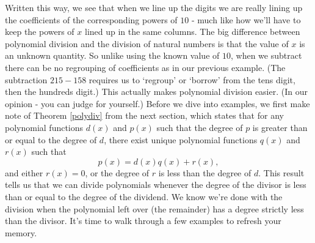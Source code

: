 Written this way, we see that when we line up the digits we are really lining up the coefficients of the corresponding powers of $10$ - much like how we'll have to keep the powers of $x$ lined up in the same columns.  The big difference between polynomial division and the division of natural numbers is that the value of $x$ is an unknown quantity.  So unlike using the known value of $10$, when we subtract there can be no regrouping of coefficients as in our previous example. (The subtraction $215 - 158$ requires us to `regroup' or `borrow' from the tens digit, then the hundreds digit.) This actually makes polynomial division easier. (In our opinion - you can judge for yourself.)  Before we dive into examples, we first make note of Theorem \ref{polydiv} from the next section, which states that for any polynomial functions $d(x)$ and $p(x)$ such that the degree of $p$ is greater than or equal to the degree of $d$, there exist unique polynomial functions $q(x)$ and $r(x)$ such that
\[
p(x) = d(x)q(x)+r(x),
\]
and either $r(x)=0$, or the degree of $r$ is less than the degree of $d$. This result tells us that we can divide polynomials whenever the degree of the divisor is less than or equal to the degree of the dividend.  We know we're done with the division when the polynomial left over (the remainder) has a degree strictly less than the divisor.  It's time to walk through a few examples to refresh your memory.

